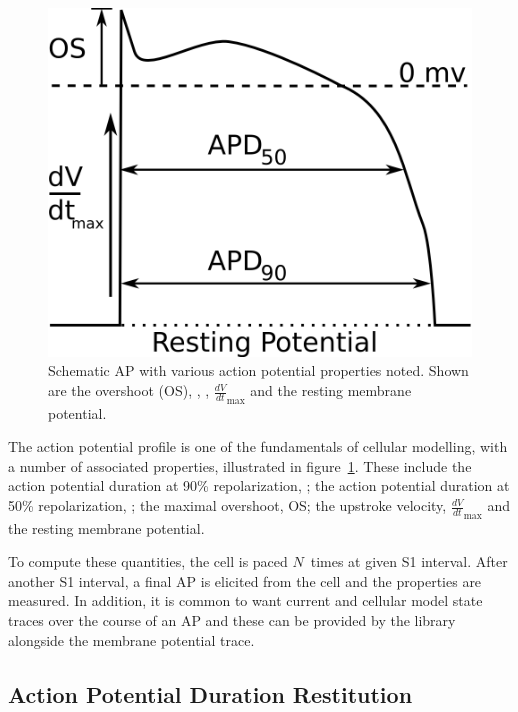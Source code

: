 \begin{figure}
\centering
\includegraphics{figures/toolkit/illustrations/labelled_ap_profile}
\caption[Illustration of AP properties]{
\label{fig:toolkit:illus:ap}
Schematic AP with various action potential properties noted.
Shown are the overshoot (OS), \apd, \apd[50], $\frac{dV}{dt}_{\text{max}}$ and
the resting membrane potential.
}
\end{figure}

The action potential profile is one of the fundamentals of cellular modelling,
with a number of associated properties, illustrated in
figure~\ref{fig:toolkit:illus:ap}.  These include the action potential
duration at 90\% repolarization, \apd; the action potential
duration at 50\% repolarization, \apd[50]; the maximal overshoot, OS; the
upstroke velocity, $\frac{dV}{dt}_{\text{max}}$ and the resting membrane
potential.

To compute these quantities, the cell is paced $N$\ times at given S1 interval.
After another S1 interval, a final AP is elicited from the cell and the
properties are measured.  In addition, it is common to want current and
cellular model state traces over the course of an AP and these can be provided
by the library alongside the membrane potential trace.

\subsection{Action Potential Duration Restitution}

